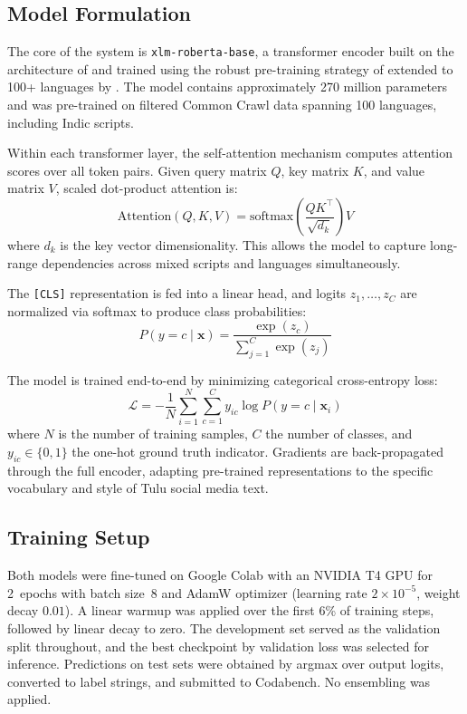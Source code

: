 \documentclass[11pt]{article}
\begin{document}
\subsection{Model Formulation}
The core of the system is \texttt{xlm-roberta-base}, a transformer encoder built on
the architecture of  and trained using the robust pre-training
strategy of  extended to 100+ languages by .
The model contains approximately 270 million parameters and was pre-trained on
filtered Common Crawl data spanning 100 languages, including Indic scripts.

Within each transformer layer, the self-attention mechanism computes attention
scores over all token pairs. Given query matrix $Q$, key matrix $K$, and value
matrix $V$, scaled dot-product attention is:
\begin{equation}
\text{Attention}(Q,K,V) = \text{softmax}\!\left(\frac{QK^{\top}}{\sqrt{d_k}}\right)V
\end{equation}
where $d_k$ is the key vector dimensionality. This allows the model to capture
long-range dependencies across mixed scripts and languages simultaneously.

The \texttt{[CLS]} representation is fed into a linear head, and logits
$z_1,\ldots,z_C$ are normalized via softmax to produce class probabilities:
\begin{equation}
P(y = c \mid \mathbf{x}) = \frac{\exp(z_c)}{\sum_{j=1}^{C}\exp(z_j)}
\end{equation}

The model is trained end-to-end by minimizing categorical cross-entropy loss:
\begin{equation}
\mathcal{L} = -\frac{1}{N}\sum_{i=1}^{N}\sum_{c=1}^{C}
  y_{ic}\log P(y = c \mid \mathbf{x}_i)
\end{equation}
where $N$ is the number of training samples, $C$ the number of classes, and
$y_{ic}\in\{0,1\}$ the one-hot ground truth indicator. Gradients are
back-propagated through the full encoder, adapting pre-trained representations
to the specific vocabulary and style of Tulu social media text.

\subsection{Training Setup}
Both models were fine-tuned on Google Colab with an NVIDIA T4 GPU for 2~epochs
with batch size~8 and AdamW optimizer (learning rate $2{\times}10^{-5}$, weight
decay $0.01$). A linear warmup was applied over the first 6\% of training steps,
followed by linear decay to zero. The development set served as the validation split
throughout, and the best checkpoint by validation loss was selected for inference.
Predictions on test sets were obtained by argmax over output logits, converted to
label strings, and submitted to Codabench. No ensembling was applied.
\end{document}

